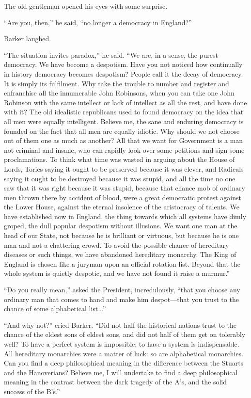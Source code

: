\documentclass{book}
\begin{document}
The old gentleman opened his eyes with some surprise.

“Are you, then,” he said, “no longer a democracy in England?”

Barker laughed.

“The situation invites paradox,” he said. “We are, in a sense, the purest democracy. We have become a despotism. Have you not noticed how continually in history democracy becomes despotism? People call it the decay of democracy. It is simply its fulfilment. Why take the trouble to number and register and enfranchise all the innumerable John Robinsons, when you can take one John Robinson with the same intellect or lack of intellect as all the rest, and have done with it? The old idealistic republicans used to found democracy on the idea that all men were equally intelligent. Believe me, the sane and enduring democracy is founded on the fact that all men are equally idiotic. Why should we not choose out of them one as much as another? All that we want for Government is a man not criminal and insane, who can rapidly look over some petitions and sign some proclamations. To think what time was wasted in arguing about the House of Lords, Tories saying it ought to be preserved because it was clever, and Radicals saying it ought to be destroyed because it was stupid, and all the time no one saw that it was right because it was stupid, because that chance mob of ordinary men thrown there by accident of blood, were a great democratic protest against the Lower House, against the eternal insolence of the aristocracy of talents. We have established now in England, the thing towards which all systems have dimly groped, the dull popular despotism without illusions. We want one man at the head of our State, not because he is brilliant or virtuous, but because he is one man and not a chattering crowd. To avoid the possible chance of hereditary diseases or such things, we have abandoned hereditary monarchy. The King of England is chosen like a juryman upon an official rotation list. Beyond that the whole system is quietly despotic, and we have not found it raise a murmur.”

“Do you really mean,” asked the President, incredulously, “that you choose any ordinary man that comes to hand and make him despot—that you trust to the chance of some alphabetical list...”

“And why not?” cried Barker. “Did not half the historical nations trust to the chance of the eldest sons of eldest sons, and did not half of them get on tolerably well? To have a perfect system is impossible; to have a system is indispensable. All hereditary monarchies were a matter of luck: so are alphabetical monarchies. Can you find a deep philosophical meaning in the difference between the Stuarts and the Hanoverians? Believe me, I will undertake to find a deep philosophical meaning in the contrast between the dark tragedy of the A’s, and the solid success of the B’s.”
\end{document}
